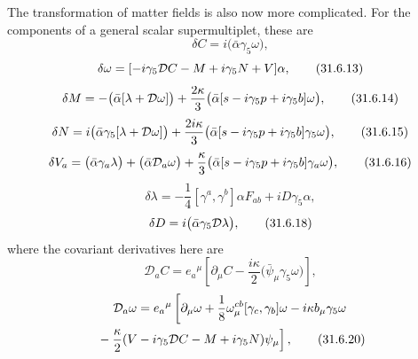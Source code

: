 The transformation of matter fields is also now more complicated. For
the components of a general scalar supermultiplet, these are
\begin{equation}
  \delta C=i\bigl(\bar\alpha\gamma_5\omega\bigr),
  \tag{31.6.12}\label{eq:31.6.12}
\end{equation}
\begin{equation}
  \delta\omega
  =[-i\gamma_5\sl{\mathcal D}C-M+i\gamma_5N+\sl{V}]\alpha,
  \tag{31.6.13}\label{eq:31.6.13}
\end{equation}
\begin{equation}
  \delta M
  =-\bigl(\bar\alpha[\lambda+\sl{\mathcal D}\omega]\bigr)
  +\frac{2\kappa}{3}
    \bigl(\bar\alpha[s-i\gamma_5p+i\gamma_5\sl{b}]\omega\bigr),
  \tag{31.6.14}\label{eq:31.6.14}
\end{equation}
\begin{equation}
  \delta N
  =i\bigl(\bar\alpha\gamma_5[\lambda+\sl{\mathcal D}\omega]\bigr)
  +\frac{2i\kappa}{3}
    \bigl(\bar\alpha
      [s-i\gamma_5p+i\gamma_5\sl{b}]\gamma_5\omega\bigr),
  \tag{31.6.15}\label{eq:31.6.15}
\end{equation}
\begin{equation}
  \delta V_a
  =\bigl(\bar\alpha\gamma_a\lambda\bigr)
   +\bigl(\bar\alpha\mathcal D_a\omega\bigr)
   +\frac{\kappa}{3}
    \bigl(\bar\alpha
      [s-i\gamma_5p+i\gamma_5\sl{b}]\gamma_a\omega\bigr),
  \tag{31.6.16}\label{eq:31.6.16}
\end{equation}
\begin{equation}
  \delta\lambda
  =-\frac{1}{4}[\gamma^a,\gamma^b]\alpha F_{ab}
   +iD\gamma_5\alpha,
  \tag{31.6.17}\label{eq:31.6.17}
\end{equation}
\begin{equation}
  \delta D=i\bigl(\bar\alpha\gamma_5\sl{\mathcal D}\lambda\bigr),
  \tag{31.6.18}\label{eq:31.6.18}
\end{equation}
where the covariant derivatives here are
\begin{equation}
  \mathcal D_aC
  =e_a{}^\mu\left[
    \partial_\mu C-\frac{i\kappa}{2}
    \bigl(\bar\psi_\mu\gamma_5\omega\bigr)
  \right],
  \tag{31.6.19}\label{eq:31.6.19}
\end{equation}
\begin{multline}
  \mathcal D_a\omega
  =e_a{}^\mu\left[
    \partial_\mu\omega
    +\frac{1}{8}\omega_\mu^{cb}[\gamma_c,\gamma_b]\omega
    -i\kappa b_\mu\gamma_5\omega\right.\\
  \left.
    {}-\frac{\kappa}{2}
      (\sl{V}-i\gamma_5\sl{\mathcal D}C-M+i\gamma_5N)\psi_\mu
  \right],
  \tag{31.6.20}\label{eq:31.6.20}
\end{multline}
